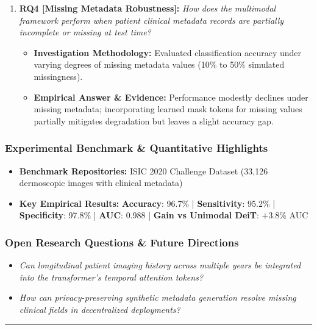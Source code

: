 \begin{enumerate}[label=\textbf{\arabic*.}, leftmargin=*]
\begin{itemize}[leftmargin=1.5em]
    \item \textbf{Empirical Answer \& Evidence:} Patient age and anatomical lesion location exhibited the highest cross-attention weights, decisively resolving visually ambiguous dysplastic nevi in older demographics.
  \end{itemize}
  \item \textbf{RQ4 [Missing Metadata Robustness]:} \textit{How does the multimodal framework perform when patient clinical metadata records are partially incomplete or missing at test time?}
  \begin{itemize}[leftmargin=1.5em]
    \item \textbf{Investigation Methodology:} Evaluated classification accuracy under varying degrees of missing metadata values (10\% to 50\% simulated missingness).
    \item \textbf{Empirical Answer \& Evidence:} Performance modestly declines under missing metadata; incorporating learned mask tokens for missing values partially mitigates degradation but leaves a slight accuracy gap.
  \end{itemize}
\end{enumerate}

\subsubsection*{Experimental Benchmark \& Quantitative Highlights}
\begin{itemize}[leftmargin=*]
  \item \textbf{Benchmark Repositories:} ISIC 2020 Challenge Dataset (33,126 dermoscopic images with clinical metadata)
  \item \textbf{Key Empirical Results:} \textbf{Accuracy}: 96.7\% \quad | \quad \textbf{Sensitivity}: 95.2\% \quad | \quad \textbf{Specificity}: 97.8\% \quad | \quad \textbf{AUC}: 0.988 \quad | \quad \textbf{Gain vs Unimodal DeiT}: +3.8\% AUC
\end{itemize}

\subsubsection*{Open Research Questions \& Future Directions}
\begin{itemize}[leftmargin=*]
  \item \textit{Can longitudinal patient imaging history across multiple years be integrated into the transformer's temporal attention tokens?}
  \item \textit{How can privacy-preserving synthetic metadata generation resolve missing clinical fields in decentralized deployments?}
\end{itemize}
\vspace{0.8em}\hrule\vspace{1.2em}
